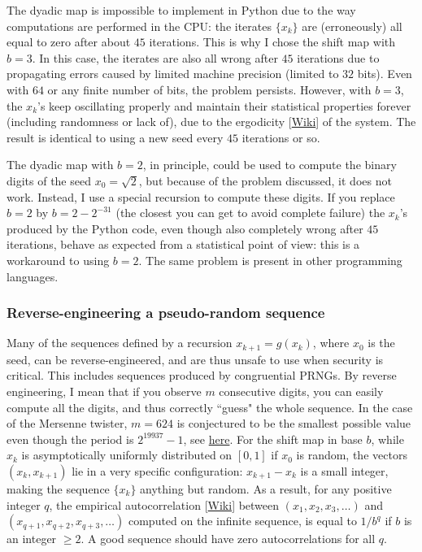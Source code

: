 \documentclass[oneside,10pt]{book}
\begin{document}
\noindent The dyadic map is impossible to implement in Python due to the way computations are performed in the CPU: the iterates 
$\{x_k\}$ are (erroneously) all equal to zero after about $45$ iterations. This is why I chose the shift map with $b=3$. In this case, the iterates are also all wrong after $45$ iterations due to propagating errors caused by limited machine precision (limited to $32$ bits). Even with $64$ or any finite number of bits, the problem persists.  However, with $b=3$, the $x_k$'s keep oscillating properly and maintain their statistical properties forever (including randomness or lack of), due to the \textcolor{index}{ergodicity} 
 [\href{https://en.wikipedia.org/wiki/Ergodicity}{Wiki}] of the system. The result is identical to using a new seed every $45$ iterations or so. 

The dyadic map with $b=2$, in principle, could be used to compute the binary digits of the seed  
$x_0=\sqrt{2}$, but because of the problem discussed, it does not work. Instead, I use a special recursion to compute these digits. If you replace $b=2$ by $b=2-2^{-31}$ (the closest you can get to avoid complete failure) the $x_k$'s produced by the Python code,  even though also completely wrong after $45$ iterations, behave as expected from a statistical point of view: this is a workaround to  using $b=2$. The same problem is present in other programming languages.

\subsubsection{Reverse-engineering a pseudo-random sequence}

Many of the sequences defined by a recursion $x_{k+1}=g(x_k)$, where $x_0$ is the seed, can be reverse-engineered, and are thus 
 unsafe to use when security is critical. This includes sequences produced by congruential PRNGs. By reverse engineering, I mean that if you observe $m$ consecutive digits, you can easily compute all the digits, and thus correctly ``guess" the whole sequence. In the case of the Mersenne twister, $m=624$ is conjectured to be the smallest possible value even though the period is $2^{\num{19937}}-1$, see \href{https://en.wikipedia.org/wiki/Mersenne_Twister}{here}. For the shift map in base $b$, while $x_k$ is asymptotically uniformly distributed on $[0, 1]$ if $x_0$ is random, the vectors $(x_k,x_{k+1})$ lie in a very specific configuration: $x_{k+1}-x_k$ is a small integer, making the sequence $\{x_k\}$ anything but random. As a result, for any positive integer $q$, the empirical \textcolor{index}{autocorrelation} 
 [\href{https://en.wikipedia.org/wiki/Autocorrelation}{Wiki}] between $(x_1, x_2,x_3,\dots)$ 
and $(x_{q+1}, x_{q+2},x_{q+3},\dots)$ computed on the infinite sequence, is equal to $1/b^q$ if $b$ is an integer $\geq 2$. 
 A good sequence should have zero autocorrelations for all $q$. 
\end{document}
